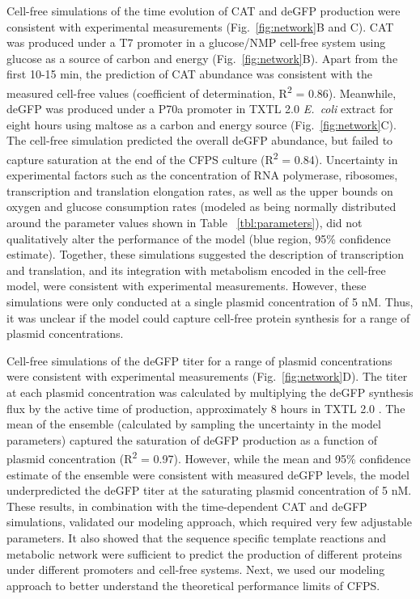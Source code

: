\documentclass[journal=asbcd6,manuscript=article]{achemso}
\begin{document}
Cell-free simulations of the time evolution of CAT and deGFP production were consistent with experimental measurements (Fig.~\ref{fig:network}B and C).
CAT was produced under a T7 promoter in a glucose/NMP cell-free system \cite{2005_calhoun_BiotechnologyProgress} using glucose as a source of carbon and energy (Fig.~\ref{fig:network}B).
Apart from the first 10-15 min, the prediction of CAT abundance was consistent with the measured cell-free values (coefficient of determination, R\textsuperscript{2} = 0.86).
Meanwhile, deGFP was produced under a P70a promoter in TXTL 2.0 \textit{E.~coli} extract for eight hours using maltose as a carbon and energy source (Fig.~\ref{fig:network}C).
The cell-free simulation predicted the overall deGFP abundance, but failed to capture saturation at the end of the CFPS culture (R\textsuperscript{2} = 0.84).
Uncertainty in experimental factors such as the concentration of RNA polymerase, ribosomes, transcription and translation elongation rates, as well as the upper bounds on oxygen and glucose consumption rates (modeled as being normally distributed around the parameter values shown in Table ~\ref{tbl:parameters}), did not qualitatively alter the performance of the model (blue region, 95\% confidence estimate).
Together, these simulations suggested the description of transcription and translation, and its integration with metabolism encoded in the cell-free model, were consistent with experimental measurements.
However, these simulations were only conducted at a single plasmid concentration of 5 nM.
Thus, it was unclear if the model could capture cell-free protein synthesis for a range of plasmid concentrations.

Cell-free simulations of the deGFP titer for a range of plasmid concentrations were consistent with experimental measurements (Fig.~\ref{fig:network}D).
The titer at each plasmid concentration was calculated by multiplying the deGFP synthesis flux by the active time of production, approximately 8 hours in TXTL 2.0 \cite{Garamella:2016aa}.
The mean of the ensemble (calculated by sampling the uncertainty in the model parameters) captured the saturation of deGFP production as a function of plasmid concentration (R\textsuperscript{2} = 0.97).
However, while the mean and 95\% confidence estimate of the ensemble were consistent with measured deGFP levels, the model underpredicted the deGFP titer at the saturating plasmid concentration of 5 nM.
These results, in combination with the time-dependent CAT and deGFP simulations, validated our modeling approach, which required very few adjustable parameters.
It also showed that the sequence specific template reactions and metabolic network were sufficient to predict the production of different proteins under different promoters and cell-free systems.
Next, we used our modeling approach to better understand the theoretical performance limits of CFPS.
\end{document}
